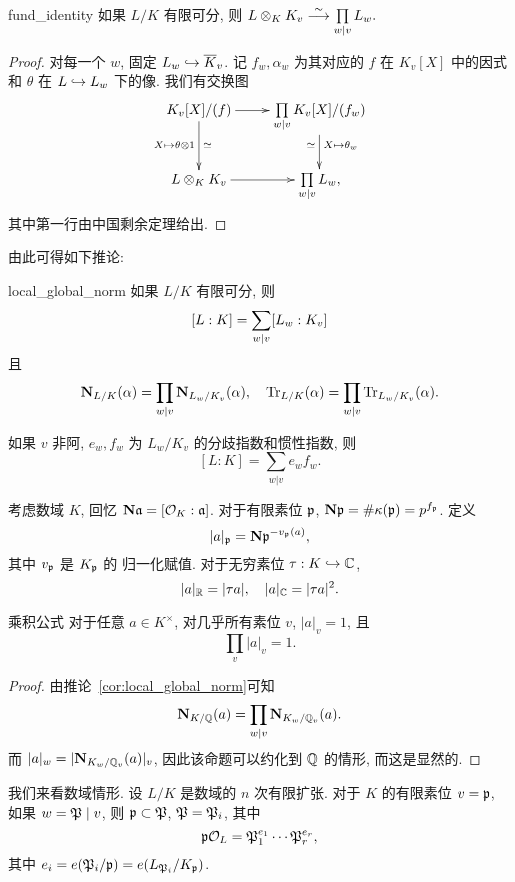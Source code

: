 \begin{proposition}{}{fund_identity}
如果 $L/K$ 有限可分, 则 $L\otimes_K K_v\stackrel{\sim}{\longrightarrow} \prod\limits_{w|v} L_w.$
\end{proposition}
\begin{proof}
对每一个 $w$, 固定 $L_w\hookrightarrow \overline K_v$. 记 $f_w,\alpha_w$ 为其对应的 $f$ 在 $K_v[X]$ 中的因式和 $\theta$ 在 $L\hookrightarrow L_w$ 下的像. 我们有交换图
  \[\xymatrix{
    K_v[X]/(f)\ar[r]\ar[d]_{X\mapsto\theta\otimes 1}^\simeq&\prod\limits_{w|v} K_v[X]/(f_w)\ar[d]_\simeq^{X\mapsto \theta_w}\\
    L\otimes_K K_v\ar[r] &\prod\limits_{w|v} L_w,
  }\]
其中第一行由中国剩余定理给出.
\end{proof}

由此可得如下推论:
\begin{corollary}{}{local_global_norm}
如果 $L/K$ 有限可分, 则
  \[ [L:K]=\sum\limits_{w|v}[L_w:K_v]\]
且
  \[{\mathbf{N}}_{L/K}(\alpha)=\prod_{w|v}{\mathbf{N}}_{L_w/K_v}(\alpha),\quad{\mathrm{Tr}}_{L/K}(\alpha)=\prod_{w|v}{\mathrm{Tr}}_{L_w/K_v}(\alpha).\]
\end{corollary}

\begin{proposition}{}{}
如果 $v$ 非阿, $e_w,f_w$ 为 $L_w/K_v$ 的分歧指数和惯性指数, 则
  \[ [L:K]=\sum_{w|v} e_w f_w.\]
\end{proposition}

考虑数域 $K$, 回忆 ${\mathbf{N}}{\mathfrak{a}}=[{\mathcal{O}}_K:{\mathfrak{a}}]$. 对于有限素位 ${\mathfrak{p}}$, ${\mathbf{N}}{\mathfrak{p}}=\#\kappa({\mathfrak{p}})=p^{f_{\mathfrak{p}}}$. 定义
  \[|a|_{\mathfrak{p}}={\mathbf{N}}{\mathfrak{p}}^{-v_{\mathfrak{p}}(a)},\]
其中 $v_{\mathfrak{p}}$ 是 $K_{\mathfrak{p}}$ 的 归一化赋值. 对于无穷素位 $\tau:K\hookrightarrow {\mathbb{C}}$,
  \[|a|_{\mathbb{R}}=|\tau a|,\quad |a|_{\mathbb{C}}=|\tau a|^2.\]

\begin{proposition}{乘积公式}{}
对于任意 $a\in K^\times$, 对几乎所有素位 $v$, $|a|_v=1$, 且
  \[\prod_v |a|_v=1.\]
\end{proposition}
\begin{proof}
由推论~\ref{cor:local_global_norm}可知
  \[{\mathbf{N}}_{K/{\mathbb{Q}}}(a)=\prod_{w\mid v}{\mathbf{N}}_{K_w/{\mathbb{Q}}_v}(a).\]
而 $|a|_w=|{\mathbf{N}}_{K_w/{\mathbb{Q}}_v}(a)|_v$, 因此该命题可以约化到 ${\mathbb{Q}}$ 的情形, 而这是显然的.
\end{proof}


我们来看数域情形. 设 $L/K$ 是数域的 $n$ 次有限扩张.
对于 $K$ 的有限素位 $v={\mathfrak{p}}$, 如果 $w={\mathfrak{P}}\mid v$, 则 ${\mathfrak{p}}\subset{\mathfrak{P}}$, ${\mathfrak{P}}={\mathfrak{P}}_i$, 其中
  \[{\mathfrak{p}}{\mathcal{O}}_L={\mathfrak{P}}_1^{e_1}\cdots{\mathfrak{P}}_r^{e_r},\]
其中 $e_i=e({\mathfrak{P}}_i/{\mathfrak{p}})=e(L_{{\mathfrak{P}}_i}/K_{\mathfrak{p}})$.

